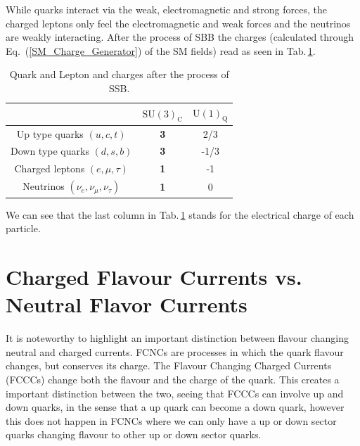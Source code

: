 \documentclass[10pt]{report}
\begin{document}
While quarks interact via the weak, electromagnetic and strong forces, the charged leptons only feel the electromagnetic and weak forces and the neutrinos are weakly interacting. 
After the process of SBB the charges (calculated through Eq.~(\ref{SM_Charge_Generator}) of the SM fields) read as seen in Tab.\,\ref{Table_Post_Break}.
%
\begin{table}[H]
	\caption{Quark and Lepton and charges after the process of SSB.}
	\centering
	\begin{tabular}{ccc}
		\hline & $\mathrm{SU(3)_C}$ & $\mathrm{U(1)_Q}$ \\
		\hline 
		Up type quarks $(u,c,t)$ & \textbf{3} & 2/3 \\
		Down type quarks $(d,s,b)$ & \textbf{3} & -1/3 \\
		Charged leptons $(e,\mu,\tau)$ & \textbf{1} & -1 \\
		Neutrinos  $(\nu_e,\nu_\mu,\nu_\tau)$  & \textbf{1} & 0 \\
		\hline	
	\end{tabular}
	\label{Table_Post_Break}
\end{table}
We can see that the last column in Tab.\,\ref{Table_Post_Break} stands for the electrical charge of each particle.


\section{Charged Flavour Currents vs. Neutral Flavor Currents}

It is noteworthy to highlight an important distinction between flavour changing neutral and charged currents. FCNCs are processes in which the quark flavour changes, but conserves its charge. The Flavour Changing Charged Currents (FCCCs) change both the flavour and the charge of the quark. This creates a important distinction between the two, seeing that FCCCs can involve up and down quarks, in the sense that a up quark can become a down quark, however this does not happen in FCNCs where we can only have a up or down sector quarks changing flavour to other up or down sector quarks. 
\end{document}
